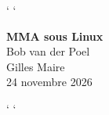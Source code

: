 {%
\catcode`\relax
\catcode`\relax
\pagecolor[rgb]{0.051,0.106,0.165}
}%
\begin{titlepage}
\vspace*{\fill}
\begin{center}
    {\fontsize{52}{62}\selectfont\bfseries\textcolor[rgb]{1,1,1}{MMA sous Linux}}\\[1.5cm]
    {\fontsize{22}{30}\selectfont\textcolor[rgb]{1,1,1}{Bob van der Poel}}\\[0.8cm]
    {\fontsize{22}{30}\selectfont\textcolor[rgb]{1,1,1}{Gilles Maire}}\\[0.8cm]
    {\fontsize{16}{24}\selectfont\textcolor[rgb]{1,1,1}{24 novembre 2026}}
\end{center}
\vspace*{\fill}
\end{titlepage}
{%
\catcode`\relax
\catcode`\relax
\pagecolor[rgb]{1,1,1}
\color[rgb]{0,0,0}
}%
